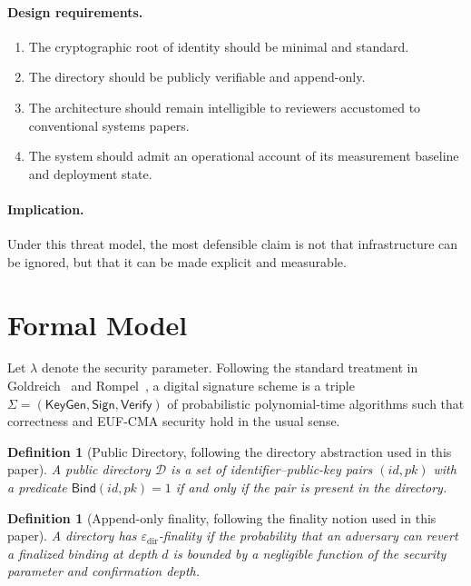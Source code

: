 \documentclass[11pt,a4paper]{article}
\newtheorem{definition}[theorem]{Definition}
\begin{document}
\paragraph{Design requirements.}
\begin{enumerate}[leftmargin=*]
  \item The cryptographic root of identity should be minimal and standard.
  \item The directory should be publicly verifiable and append-only.
  \item The architecture should remain intelligible to reviewers accustomed to conventional systems papers.
  \item The system should admit an operational account of its measurement baseline and deployment state.
\end{enumerate}

\paragraph{Implication.} Under this threat model, the most defensible claim is not that infrastructure can be ignored, but that it can be made explicit and measurable.

\section{Formal Model}

Let $\lambda$ denote the security parameter. Following the standard treatment in Goldreich~\cite{goldreich2001} and Rompel~\cite{rompel1990}, a digital signature scheme is a triple $\Sigma=(\mathsf{KeyGen},\mathsf{Sign},\mathsf{Verify})$ of probabilistic polynomial-time algorithms such that correctness and EUF-CMA security hold in the usual sense.

\begin{definition}[Public Directory, following the directory abstraction used in this paper]
A public directory $\mathcal{D}$ is a set of identifier--public-key pairs $(id,pk)$ with a predicate $\mathsf{Bind}(id,pk)=1$ if and only if the pair is present in the directory.
\end{definition}

\begin{definition}[Append-only finality, following the finality notion used in this paper]
A directory has $\varepsilon_{\mathrm{dir}}$-finality if the probability that an adversary can revert a finalized binding at depth $d$ is bounded by a negligible function of the security parameter and confirmation depth.
\end{definition}
\end{document}
